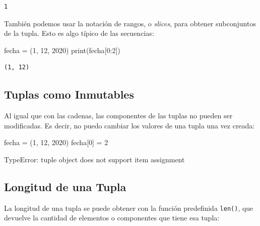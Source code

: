 \documentclass[
  letterpaper,
  DIV=11,
  numbers=noendperiod]{scrreprt}
\newenvironment{Shaded}{\begin{snugshade}}{\end{snugshade}}
\newcommand{\BuiltInTok}[1]{\textcolor[rgb]{0.00,0.23,0.31}{#1}}
\newcommand{\DecValTok}[1]{\textcolor[rgb]{0.68,0.00,0.00}{#1}}
\newcommand{\NormalTok}[1]{\textcolor[rgb]{0.00,0.23,0.31}{#1}}
\newcommand{\OperatorTok}[1]{\textcolor[rgb]{0.37,0.37,0.37}{#1}}
\begin{document}
\begin{verbatim}
1
\end{verbatim}

También podemos usar la notación de rangos, o \emph{slices}, para
obtener subconjuntos de la tupla. Esto es algo típico de las secuencias:

\begin{Shaded}
\begin{Highlighting}[]
\NormalTok{fecha }\OperatorTok{=}\NormalTok{ (}\DecValTok{1}\NormalTok{, }\DecValTok{12}\NormalTok{, }\DecValTok{2020}\NormalTok{)}
\BuiltInTok{print}\NormalTok{(fecha[}\DecValTok{0}\NormalTok{:}\DecValTok{2}\NormalTok{])}
\end{Highlighting}
\end{Shaded}

\begin{verbatim}
(1, 12)
\end{verbatim}

\subsection{Tuplas como Inmutables}\label{tuplas-como-inmutables}

Al igual que con las cadenas, las componentes de las tuplas no pueden
ser modificadas. Es decir, no puedo cambiar los valores de una tupla una
vez creada:

\begin{Shaded}
\begin{Highlighting}[]
\NormalTok{fecha }\OperatorTok{=}\NormalTok{ (}\DecValTok{1}\NormalTok{, }\DecValTok{12}\NormalTok{, }\DecValTok{2020}\NormalTok{)}
\NormalTok{fecha[}\DecValTok{0}\NormalTok{] }\OperatorTok{=} \DecValTok{2}
\end{Highlighting}
\end{Shaded}

\begin{Shaded}
\begin{Highlighting}[]
\NormalTok{TypeError: \textquotesingle{}tuple\textquotesingle{} object does not support item assignment}
\end{Highlighting}
\end{Shaded}

\subsection{Longitud de una Tupla}\label{longitud-de-una-tupla}

La longitud de una tupla se puede obtener con la función predefinida
\texttt{len()}, que devuelve la cantidad de elementos o componentes que
tiene esa tupla:
\end{document}
